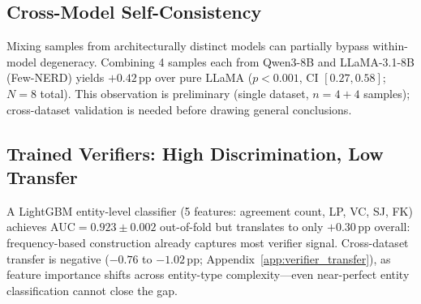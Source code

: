 \subsection{Cross-Model Self-Consistency}\label{sec:cross_model}

Mixing samples from architecturally distinct models can partially bypass within-model degeneracy.
Combining 4 samples each from Qwen3-8B and LLaMA-3.1-8B (Few-NERD) yields $+0.42$\,pp over pure LLaMA ($p{<}0.001$, CI $[0.27, 0.58]$; $N{=}8$ total).
This observation is preliminary (single dataset, $n{=}4{+}4$ samples); cross-dataset validation is needed before drawing general conclusions.

\subsection{Trained Verifiers: High Discrimination, Low Transfer}\label{sec:verifier}

A LightGBM entity-level classifier (5 features: agreement count, LP, VC, SJ, FK) achieves AUC${=}0.923{\pm}0.002$ out-of-fold but translates to only $+0.30$\,pp overall: frequency-based construction already captures most verifier signal.
Cross-dataset transfer is negative ($-0.76$ to $-1.02$\,pp; Appendix~\ref{app:verifier_transfer}), as feature importance shifts across entity-type complexity---even near-perfect entity classification cannot close the gap.
